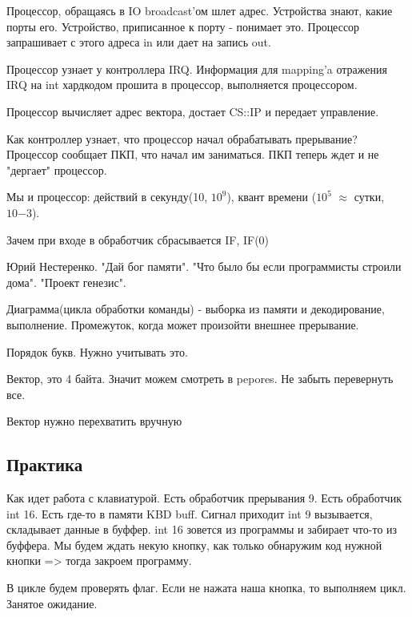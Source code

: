 Процессор, обращаясь в IO broadcast'ом шлет адрес. Устройства знают, какие порты его. Устройство, приписанное к порту - понимает это. Процессор запрашивает с этого адреса in или дает на запись out.  

Процессор узнает у контроллера IRQ. Информация для mapping'a отражения IRQ на int хардкодом прошита в процессор, выполняется процессором. 

Процессор вычисляет адрес вектора, достает CS::IP и передает управление. 

\begin{rem} Как контроллер узнает, что процессор начал обрабатывать прерывание? Процессор сообщает ПКП, что начал им заниматься. ПКП теперь ждет и не "дергает" процессор.\end{rem} 

Мы и процессор: действий в секунду(10, $10^{9}$), квант времени ($10^{5}$ $\approx$ сутки, $10{-3}$).

\begin{rem} Зачем при входе в обработчик сбрасывается IF, IF(0)\end{rem} 

\begin{off} Юрий Нестеренко. "Дай бог памяти". "Что было бы если программисты строили дома". "Проект генезис".\end{off}

Диаграмма(цикла обработки команды) - выборка из памяти и декодирование, выполнение. Промежуток, когда может произойти внешнее прерывание. 

Порядок букв. Нужно учитывать это. 

Вектор, это 4 байта. Значит можем смотреть в pepores. Не забыть перевернуть все. 
\begin{hw} Вектор нужно перехватить вручную\end{hw}

\subsection{Практика}
Как идет работа с клавиатурой. Есть обработчик прерывания 9. Есть обработчик int 16. Есть где-то в памяти KBD buff. Сигнал приходит int 9 вызывается, складывает данные в буффер. int 16 зовется из программы и забирает что-то из буффера. Мы будем ждать некую кнопку, как только обнаружим код нужной кнопки => тогда закроем программу. 

В цикле будем проверять флаг. Если не нажата наша кнопка, то выполняем цикл. Занятое ожидание.  

